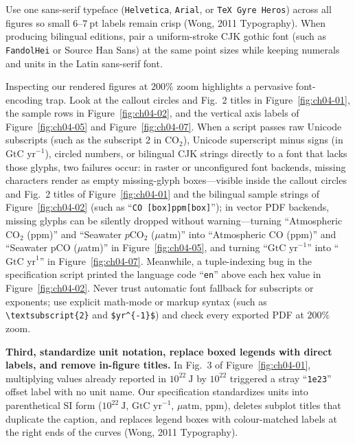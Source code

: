 Use one sans-serif typeface (\texttt{Helvetica}, \texttt{Arial}, or \texttt{TeX Gyre Heros}) across all figures so small $6\text{--}7\ \text{pt}$ labels remain crisp (Wong, 2011 Typography). When producing bilingual editions, pair a uniform-stroke CJK gothic font (such as \texttt{FandolHei} or Source Han Sans) at the same point sizes while keeping numerals and units in the Latin sans-serif font.

Inspecting our rendered figures at $200\%$ zoom highlights a pervasive font-encoding trap. Look at the callout circles and Fig.\ 2 titles in Figure~\ref{fig:ch04-01}, the sample rows in Figure~\ref{fig:ch04-02}, and the vertical axis labels of Figure~\ref{fig:ch04-05} and Figure~\ref{fig:ch04-07}. When a script passes raw Unicode subscripts (such as the subscript $2$ in $\text{CO}_2$), Unicode superscript minus signs (in $\text{GtC yr}^{-1}$), circled numbers, or bilingual CJK strings directly to a font that lacks those glyphs, two failures occur: in raster or unconfigured font backends, missing characters render as empty missing-glyph boxes---visible inside the callout circles and Fig.\ 2 titles of Figure~\ref{fig:ch04-01} and the bilingual sample strings of Figure~\ref{fig:ch04-02} (such as ``\texttt{CO [box]ppm[box]}''); in vector PDF backends, missing glyphs can be silently dropped without warning---turning ``Atmospheric $\text{CO}_2$ (ppm)'' and ``Seawater $p\text{CO}_2$ ($\mu\text{atm}$)'' into ``Atmospheric CO (ppm)'' and ``Seawater pCO ($\mu$atm)'' in Figure~\ref{fig:ch04-05}, and turning ``$\text{GtC yr}^{-1}$'' into ``$\text{GtC yr}^{1}$'' in Figure~\ref{fig:ch04-07}. Meanwhile, a tuple-indexing bug in the specification script printed the language code ``\texttt{en}'' above each hex value in Figure~\ref{fig:ch04-02}. Never trust automatic font fallback for subscripts or exponents; use explicit math-mode or markup syntax (such as \texttt{\textbackslash textsubscript\{2\}} and \texttt{\$yr\^{}\{-1\}\$}) and check every exported PDF at $200\%$ zoom.

\textbf{Third, standardize unit notation, replace boxed legends with direct labels, and remove in-figure titles.} In Fig.\ 3 of Figure~\ref{fig:ch04-01}, multiplying values already reported in $10^{22}\ \text{J}$ by $10^{22}$ triggered a stray ``\texttt{1e23}'' offset label with no unit name. Our specification standardizes units into parenthetical SI form ($10^{22}\ \text{J}$, $\text{GtC yr}^{-1}$, $\mu\text{atm}$, ppm), deletes subplot titles that duplicate the caption, and replaces legend boxes with colour-matched labels at the right ends of the curves (Wong, 2011 Typography).

